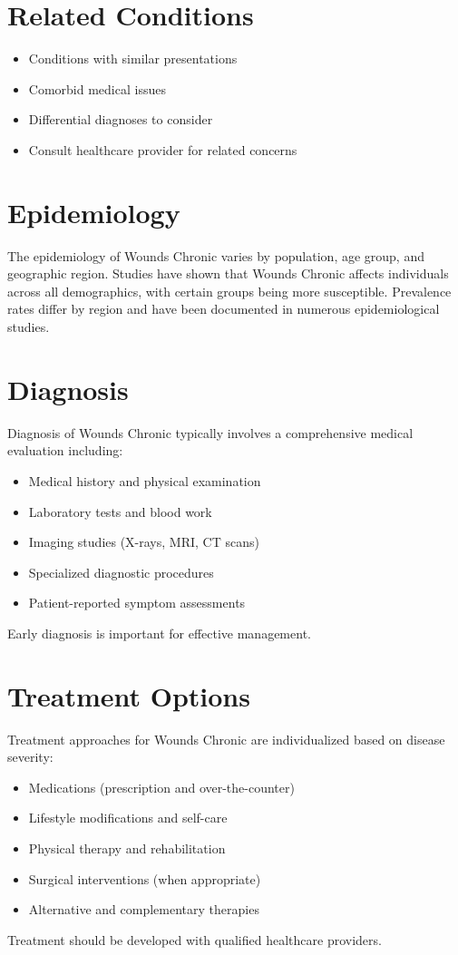 \section*{Related Conditions}
\begin{itemize}
  \item Conditions with similar presentations
  \item Comorbid medical issues
  \item Differential diagnoses to consider
  \item Consult healthcare provider for related concerns
\end{itemize}

\section*{Epidemiology}
The epidemiology of Wounds Chronic varies by population, age group, and geographic region. Studies have shown that Wounds Chronic affects individuals across all demographics, with certain groups being more susceptible. Prevalence rates differ by region and have been documented in numerous epidemiological studies.

\section*{Diagnosis}
Diagnosis of Wounds Chronic typically involves a comprehensive medical evaluation including:
\begin{itemize}
  \item Medical history and physical examination
  \item Laboratory tests and blood work
  \item Imaging studies (X-rays, MRI, CT scans)
  \item Specialized diagnostic procedures
  \item Patient-reported symptom assessments
\end{itemize}
Early diagnosis is important for effective management.

\section*{Treatment Options}
Treatment approaches for Wounds Chronic are individualized based on disease severity:
\begin{itemize}
  \item Medications (prescription and over-the-counter)
  \item Lifestyle modifications and self-care
  \item Physical therapy and rehabilitation
  \item Surgical interventions (when appropriate)
  \item Alternative and complementary therapies
\end{itemize}
Treatment should be developed with qualified healthcare providers.


